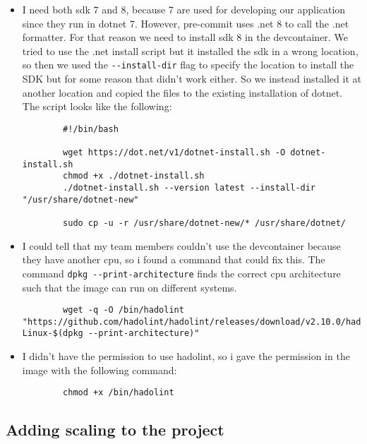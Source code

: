\begin{itemize}
    \item I need both sdk 7 and 8, because 7 are used for developing our application since they run in dotnet 7. However, pre-commit uses .net 8 to call the .net formatter. For that reason we need to install sdk 8 in the devcontainer. We tried to use the .net install script but it installed the sdk in a wrong location, so then we used the \texttt{-\/-install-dir} flag to specify the location to install the SDK but for some reason that didn't work either. So we instead installed it at another location and copied the files to the existing installation of dotnet. The script looks like the following:

    \begin{verbatim}
        #!/bin/bash

        wget https://dot.net/v1/dotnet-install.sh -O dotnet-install.sh
        chmod +x ./dotnet-install.sh
        ./dotnet-install.sh --version latest --install-dir "/usr/share/dotnet-new"

        sudo cp -u -r /usr/share/dotnet-new/* /usr/share/dotnet/
    \end{verbatim}

    \item I could tell that my team members couldn't use the devcontainer because they have another cpu, so i found a command that could fix this. The command \texttt{dpkg\ -\/-print-architecture} finds the correct cpu architecture such that the image can run on different systems.
    \begin{verbatim}
        wget -q -O /bin/hadolint "https://github.com/hadolint/hadolint/releases/download/v2.10.0/hadolint-Linux-$(dpkg --print-architecture)"
    \end{verbatim}

    \item I didn't have the permission to use hadolint, so i gave the permission in the image with the following command:
    \begin{verbatim}
        chmod +x /bin/hadolint
    \end{verbatim}
\end{itemize}

\subsection{Adding scaling to the project}
\label{log:adding-scaling-to-the-project}


